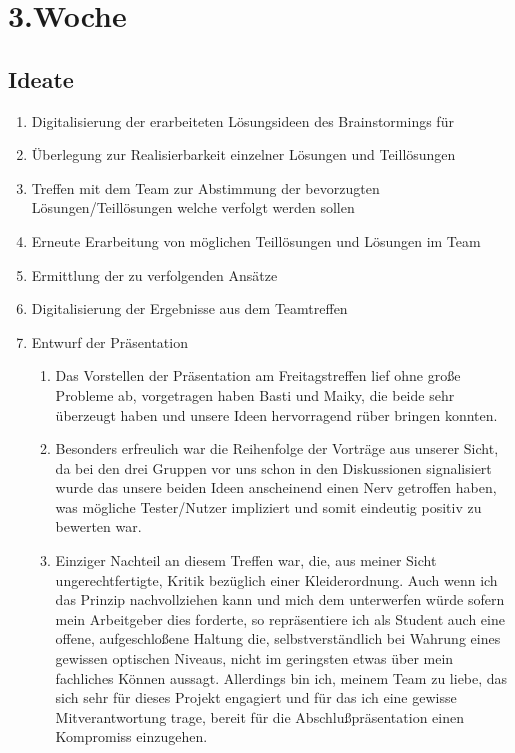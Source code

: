 \chapter{3.\hspace{0.5em}Woche}\label{wo3}

\section{Ideate}\label{wo3_1}

\begin{enumerate}[label={\Roman*)}]
	\item Digitalisierung der erarbeiteten L\"osungsideen des Brainstormings f\"ur
	\item \"Uberlegung zur Realisierbarkeit einzelner L\"osungen und Teill\"osungen
	\item Treffen mit dem Team zur Abstimmung der bevorzugten L\"osungen/Teill\"osungen welche verfolgt werden sollen
	\item Erneute Erarbeitung von m\"oglichen Teill\"osungen und L\"osungen im Team
	\item Ermittlung der zu verfolgenden Ans\"atze
	\item Digitalisierung der Ergebnisse aus dem Teamtreffen
	\item Entwurf der Pr\"asentation
	\begin{enumerate}[label={\arabic*}]
		\item Das Vorstellen der Pr\"asentation am Freitagstreffen lief ohne gro\ss{}e Probleme ab, vorgetragen haben
Basti und Maiky, die beide sehr \"uberzeugt haben und unsere Ideen hervorragend r\"uber bringen konnten.
		\item Besonders erfreulich war die Reihenfolge der Vortr\"age aus unserer Sicht, da bei den drei Gruppen vor uns
schon in den Diskussionen signalisiert wurde das unsere beiden Ideen anscheinend einen Nerv getroffen haben, was m\"ogliche
Tester/Nutzer impliziert und somit eindeutig positiv zu bewerten war.
		\item Einziger Nachteil an diesem Treffen war, die, aus meiner Sicht ungerechtfertigte, Kritik bez\"uglich einer
Kleiderordnung. Auch wenn ich das Prinzip nachvollziehen kann und mich dem unterwerfen w\"urde sofern mein Arbeitgeber dies
forderte, so repr\"asentiere ich als Student auch eine offene, aufgeschlo\ss{}ene Haltung die, selbstverst\"andlich bei Wahrung
eines gewissen optischen Niveaus, nicht im geringsten etwas \"uber mein fachliches K\"onnen aussagt. Allerdings bin ich, meinem
Team zu liebe, das sich sehr f\"ur dieses Projekt engagiert und f\"ur das ich eine gewisse Mitverantwortung trage, bereit f\"ur
die Abschlu\ss{}pr\"asentation einen Kompromiss einzugehen.
	\end{enumerate}
\end{enumerate}